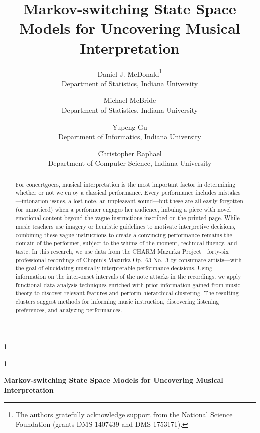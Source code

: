 \documentclass[12pt]{article}
\newcommand{\blind}{1}
\begin{document}
\blind
{
\title{Markov-switching State Space Models for Uncovering Musical Interpretation}
\author{Daniel J. McDonald\thanks{
    The authors gratefully acknowledge
    support from the National Science Foundation (grants DMS-1407439
    and DMS-1753171).}\hspace{.2cm}\\ 
    Department of Statistics, Indiana University
    \and
    Michael McBride\\
    Department of Statistics, Indiana University
    \and
    Yupeng Gu\\
    Department of Informatics, Indiana University
    \and
    Christopher Raphael\\
    Department of Computer Science, Indiana University
  }
  
\maketitle
} \fi

\blind
{
  \bigskip
  \bigskip
  \bigskip
  \begin{center}
    {\LARGE\bf Markov-switching State Space Models for Uncovering Musical Interpretation}
\end{center}
  \medskip
} \fi

\bigskip
\begin{abstract}
For concertgoers, musical interpretation is the most important factor
in determining whether or not we enjoy a classical performance. Every
performance includes mistakes---intonation issues, a lost note, an
unpleasant sound---but these are all easily forgotten (or unnoticed) when a performer
engages her audience, imbuing a piece with novel emotional content
beyond the vague instructions inscribed on the printed page. While music teachers use
imagery or heuristic guidelines to motivate interpretive decisions, combining these
vague instructions to create a convincing performance remains the domain
of the performer, subject to the whims of the moment, technical
fluency, and taste. In this
research, we use data from the CHARM Mazurka Project---forty-six professional
recordings of Chopin's Mazurka Op.\ 63 No.\ 3 by consumate artists---with the goal of
elucidating musically interpretable performance decisions. Using information on the
inter-onset intervals of the note attacks in the recordings, we apply functional data
analysis techniques enriched with prior information gained from music
theory to discover relevant features and perform hierarchical
clustering. The resulting clusters suggest methods for informing music
instruction, discovering listening preferences, and analyzing performances.

\end{abstract}
\end{document}
